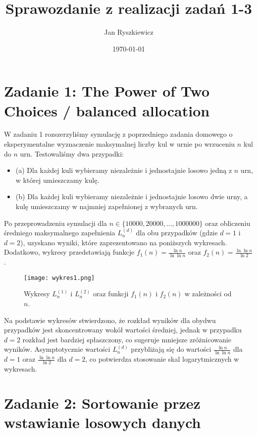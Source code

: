 \documentclass{article}
\title{Sprawozdanie z realizacji zadań 1-3}
\author{Jan Ryszkiewicz}
\date{\today}
\begin{document}
\maketitle

\section*{Zadanie 1: The Power of Two Choices / balanced allocation}

W zadaniu 1 rozszerzyliśmy symulację z poprzedniego zadania domowego o eksperymentalne wyznaczenie maksymalnej liczby kul w urnie po wrzuceniu \(n\) kul do \(n\) urn. Testowaliśmy dwa przypadki:

\begin{itemize}
    \item (a) Dla każdej kuli wybieramy niezależnie i jednostajnie losowo jedną z \(n\) urn, w której umieszczamy kulę.
    \item (b) Dla każdej kuli wybieramy niezależnie i jednostajnie losowo dwie urny, a kulę umieszczamy w najmniej zapełnionej z wybranych urn.
\end{itemize}

Po przeprowadzeniu symulacji dla \(n \in \{10 000, 20 000, \dots, 1 000 000\}\) oraz obliczeniu średniego maksymalnego zapełnienia \(L^{(d)}_n\) dla obu przypadków (gdzie \(d = 1\) i \(d = 2\)), uzyskano wyniki, które zaprezentowano na poniższych wykresach. Dodatkowo, wykresy przedstawiają funkcje \(f_1(n) = \frac{\ln n}{\ln \ln n}\) oraz \(f_2(n) = \frac{\ln \ln n}{\ln 2}\).

\begin{figure}[ht]
    \centering
    \texttt{[image: wykres1.png]}
    \caption{Wykresy \(L^{(1)}_n\) i \(L^{(2)}_n\) oraz funkcji \(f_1(n)\) i \(f_2(n)\) w zależności od \(n\).}
    \label{fig:wykres1}
\end{figure}

Na podstawie wykresów stwierdzono, że rozkład wyników dla obydwu przypadków jest skoncentrowany wokół wartości średniej, jednak w przypadku \(d = 2\) rozkład jest bardziej spłaszczony, co sugeruje mniejsze zróżnicowanie wyników. Asymptotycznie wartości \(L^{(d)}_n\) przybliżają się do wartości \(\frac{\ln n}{\ln \ln n}\) dla \(d = 1\) oraz \(\frac{\ln \ln n}{\ln 2}\) dla \(d = 2\), co potwierdza stosowanie skal logarytmicznych w wykresach.

\section*{Zadanie 2: Sortowanie przez wstawianie losowych danych}
\end{document}
